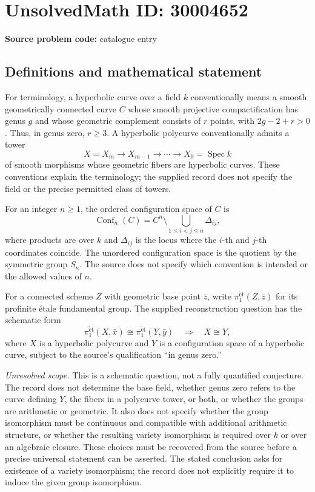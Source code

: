 \documentclass[11pt]{article}
\begin{document}
\section*{UnsolvedMath ID: 30004652}
\textbf{Source problem code:} catalogue entry
\subsection{Definitions and mathematical statement}
For terminology, a hyperbolic curve over a field \(k\) conventionally means a smooth geometrically connected curve \(C\) whose smooth projective compactification has genus \(g\) and whose geometric complement consists of \(r\) points, with \(2g-2+r>0\). Thus, in genus zero, \(r\geq 3\). A hyperbolic polycurve conventionally admits a tower
\[
X=X_m\longrightarrow X_{m-1}\longrightarrow\cdots\longrightarrow X_0=\operatorname{Spec}k
\]
of smooth morphisms whose geometric fibers are hyperbolic curves. These conventions explain the terminology; the supplied record does not specify the field or the precise permitted class of towers.

For an integer \(n\geq 1\), the ordered configuration space of \(C\) is
\[
\operatorname{Conf}_n(C)=C^n\setminus\bigcup_{1\leq i<j\leq n}\Delta_{ij},
\]
where products are over \(k\) and \(\Delta_{ij}\) is the locus where the \(i\)-th and \(j\)-th coordinates coincide. The unordered configuration space is the quotient by the symmetric group \(S_n\). The source does not specify which convention is intended or the allowed values of \(n\).

For a connected scheme \(Z\) with geometric base point \(\bar z\), write \(\pi_1^{\mathrm{\acute et}}(Z,\bar z)\) for its profinite \'{e}tale fundamental group. The supplied reconstruction question has the schematic form
\[
\pi_1^{\mathrm{\acute et}}(X,\bar x)\cong
\pi_1^{\mathrm{\acute et}}(Y,\bar y)
\quad\Longrightarrow\quad X\cong Y,
\]
where \(X\) is a hyperbolic polycurve and \(Y\) is a configuration space of a hyperbolic curve, subject to the source's qualification ``in genus zero.''

\textit{Unresolved scope.} This is a schematic question, not a fully quantified conjecture. The record does not determine the base field, whether genus zero refers to the curve defining \(Y\), the fibers in a polycurve tower, or both, or whether the groups are arithmetic or geometric. It also does not specify whether the group isomorphism must be continuous and compatible with additional arithmetic structure, or whether the resulting variety isomorphism is required over \(k\) or over an algebraic closure. These choices must be recovered from the source before a precise universal statement can be asserted. The stated conclusion asks for existence of a variety isomorphism; the record does not explicitly require it to induce the given group isomorphism.
\end{document}

